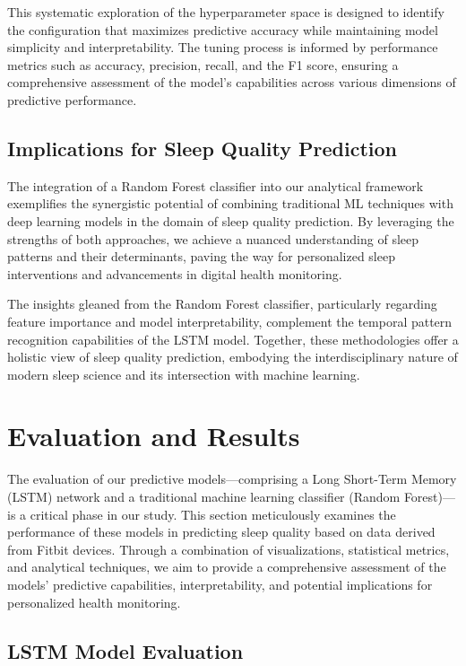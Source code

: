 \documentclass[10pt]{extarticle}
\begin{document}
This systematic exploration of the hyperparameter space is designed to identify the configuration that maximizes predictive accuracy while maintaining model simplicity and interpretability. The tuning process is informed by performance metrics such as accuracy, precision, recall, and the F1 score, ensuring a comprehensive assessment of the model's capabilities across various dimensions of predictive performance.

\subsection{Implications for Sleep Quality Prediction}

The integration of a Random Forest classifier into our analytical framework exemplifies the synergistic potential of combining traditional ML techniques with deep learning models in the domain of sleep quality prediction. By leveraging the strengths of both approaches, we achieve a nuanced understanding of sleep patterns and their determinants, paving the way for personalized sleep interventions and advancements in digital health monitoring.

The insights gleaned from the Random Forest classifier, particularly regarding feature importance and model interpretability, complement the temporal pattern recognition capabilities of the LSTM model. Together, these methodologies offer a holistic view of sleep quality prediction, embodying the interdisciplinary nature of modern sleep science and its intersection with machine learning.

\section{Evaluation and Results}

The evaluation of our predictive models—comprising a Long Short-Term Memory (LSTM) network and a traditional machine learning classifier (Random Forest)—is a critical phase in our study. This section meticulously examines the performance of these models in predicting sleep quality based on data derived from Fitbit devices. Through a combination of visualizations, statistical metrics, and analytical techniques, we aim to provide a comprehensive assessment of the models' predictive capabilities, interpretability, and potential implications for personalized health monitoring.

\subsection{LSTM Model Evaluation}
\end{document}
